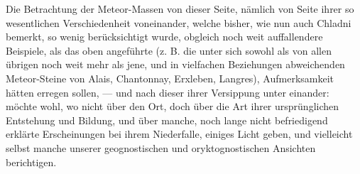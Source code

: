 \documentclass[a4paper, 11pt, oneside, german]{article}
\begin{document}
{Die Betrachtung der Meteor-Massen von dieser Seite, nämlich von Seite ihrer so wesentlichen Verschiedenheit voneinander, welche bisher, wie nun auch Chladni bemerkt, so wenig berücksichtigt wurde, obgleich noch weit auffallendere Beispiele, als das oben angeführte (z. B. die unter sich sowohl als von allen übrigen noch weit mehr als jene, und in vielfachen Beziehungen abweichenden Meteor-Steine von Alais, Chantonnay, Erxleben, Langres), Aufmerksamkeit hätten erregen sollen, --- und nach dieser ihrer Versippung unter einander: möchte wohl, wo nicht über den Ort, doch über die Art ihrer ursprünglichen Entstehung und Bildung, und über manche, noch lange nicht befriedigend erklärte Erscheinungen bei ihrem Niederfalle, einiges Licht geben, und vielleicht selbst manche unserer geognostischen und oryktognostischen Ansichten berichtigen.}
\end{document}
